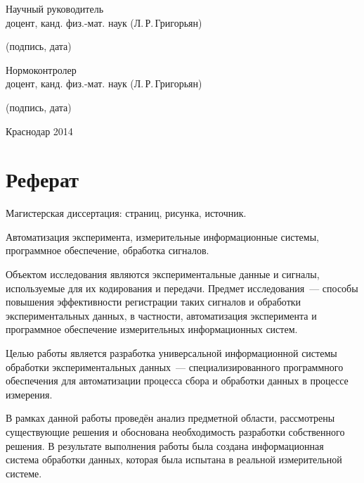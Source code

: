 \documentclass[a4paper, 14pt, titlepage]{extarticle}
\newcommand\sectiontoc[1]{\section*{\centering #1}\addcontentsline{toc}{section}{#1}}
\let\oldsection\section
\renewcommand{\section}{\newpage\oldsection}
\begin{document}
\begin {center}
\begin{flushleft}
    Научный руководитель\\
    доцент, канд. физ.-мат. наук \hrulefill{} (Л.\,Р.\,Григорьян)
    \\[-3mm]{\footnotesize\centering (подпись, дата)\par}

    Нормоконтролер\\
    доцент, канд. физ.-мат. наук \hrulefill{} (Л.\,Р.\,Григорьян)
    \\[-3mm]{\footnotesize\centering (подпись, дата)\par}
  \end{flushleft}

  \vfill

  Краснодар 2014
  \end {center}

  \sectiontoc{Реферат}

  Магистерская диссертация:  страниц, %
   рисунка,  источник.

  Автоматизация эксперимента, измерительные информационные системы, программное обеспечение,
  обработка сигналов.

  Объектом исследования являются экспериментальные данные и сигналы, используемые для их кодирования
  и передачи. Предмет исследования~--- способы повышения эффективности регистрации таких сигналов и
  обработки экспериментальных данных, в частности, автоматизация эксперимента и программное
  обеспечение измерительных информационных систем.

  Целью работы является разработка универсальной информационной системы обработки экспериментальных
  данных~--- специализированного программного обеспечения для автоматизации процесса сбора и
  обработки данных в процессе измерения.

  В рамках данной работы проведён анализ предметной области, рассмотрены существующие решения и
  обоснована необходимость разработки собственного решения. В результате выполнения работы была
  создана информационная система обработки данных, которая была испытана в реальной измерительной
  системе.



    \clearpage
    \tableofcontents
\end{document}
